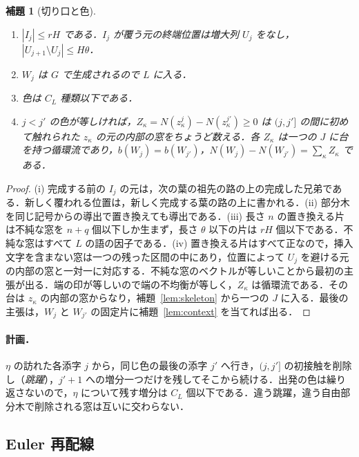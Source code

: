 \documentclass[11pt,a4paper]{ltjsarticle}
\numberwithin{equation}{section}
\theoremstyle{plain}
\newtheorem{lemma}[theorem]{補題}
\theoremstyle{definition}
\theoremstyle{remark}
\theoremstyle{plain}
\begin{document}
\begin{lemma}[切り口と色]
\label{lem:colours}
\begin{enumerate}[label=(\roman*),leftmargin=*]
\item $|I_j|\le rH$ である．$I_j$ が覆う元の終端位置は増大列 $U_j$ をなし，$|U_{j+1}\setminus U_j|\le H\theta$．
\item $W_j$ は $G$ で生成されるので $L$ に入る．
\item 色は $C_L$ 種類以下である．
\item $j<j'$ の色が等しければ，$Z_\kappa=N(z^j_\kappa)-N(z^{j'}_\kappa)\ge0$ は $(j,j']$ の間に初めて触れられた $z_\kappa$ の元の内部の窓をちょうど数える．各 $Z_\kappa$ は一つの $J$ に台を持つ循環流であり，$b(W_j)=b(W_{j'})$，$N(W_j)-N(W_{j'})=\sum_\kappa Z_\kappa$ である．
\end{enumerate}
\end{lemma}

\begin{proof}
(i) 完成する前の $I_j$ の元は，次の葉の祖先の路の上の完成した兄弟である．新しく覆われる位置は，新しく完成する葉の路の上に書かれる．(ii) 部分木を同じ記号からの導出で置き換えても導出である．(iii) 長さ $n$ の置き換える片は不純な窓を $n+q$ 個以下しか生まず，長さ $\theta$ 以下の片は $rH$ 個以下である．不純な窓はすべて $L$ の語の因子である．(iv) 置き換える片はすべて正なので，挿入文字を含まない窓は一つの残った区間の中にあり，位置によって $U_j$ を避ける元の内部の窓と一対一に対応する．不純な窓のベクトルが等しいことから最初の主張が出る．端の印が等しいので端の不均衡が等しく，$Z_\kappa$ は循環流である．その台は $z_\kappa$ の内部の窓からなり，補題~\ref{lem:skeleton} から一つの $J$ に入る．最後の主張は，$W_j$ と $W_{j'}$ の固定片に補題~\ref{lem:context} を当てれば出る．
\end{proof}

\paragraph{計画．}
$\eta$ の訪れた各添字 $j$ から，同じ色の最後の添字 $j'$ へ行き，$(j,j']$ の初接触を削除し（\emph{跳躍}），$j'+1$ への増分一つだけを残してそこから続ける．出発の色は繰り返さないので，$\eta$ について残す増分は $C_L$ 個以下である．違う跳躍，違う自由部分木で削除される窓は互いに交わらない．

\subsection{Euler 再配線}
\end{document}
